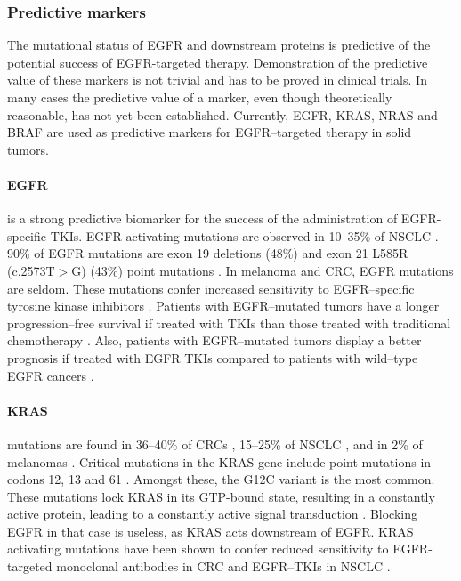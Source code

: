 {{{    \subsubsection{Predictive markers}

      The mutational status of EGFR and downstream proteins is predictive of the
      potential success of EGFR-targeted therapy. Demonstration of the
      predictive value of these markers is not trivial and has to be proved in
      clinical trials. In many cases the predictive value of a marker, even
      though theoretically reasonable, has not yet been established. Currently,
      EGFR, KRAS, NRAS and BRAF are  used as predictive markers for
      EGFR--targeted therapy in solid tumors.

      \paragraph{EGFR} is a strong predictive biomarker for the success of the
      administration of EGFR-specific TKIs. EGFR activating mutations are
      observed in 10--35\% of NSCLC {\cite{egfr_nsclc}}. 90\% of EGFR mutations are exon 19
      deletions (48\%) and exon 21 L585R (c.2573T$>$G) (43\%) point mutations {\cite{egfr_nsclc_2}}.
      In melanoma and CRC, EGFR mutations are seldom. These mutations confer
      increased sensitivity to EGFR--specific tyrosine kinase inhibitors  {\cite{egfr_nsclc_2}}.
      Patients with EGFR--mutated tumors have a longer progression--free
      survival if treated with TKIs than those treated with traditional
      chemotherapy {\cite{egfr_nsclc_2}}. Also, patients with EGFR--mutated tumors display a better
      prognosis if treated with EGFR TKIs compared to patients with wild--type
      EGFR cancers {\cite{egfr_nsclc_2}}.

      \paragraph{KRAS} mutations are found in 36--40\% of CRCs {\cite{kras_crc}}, 15--25\% of
      NSCLC {\cite{kras_nsclc}}, and in 2\% of melanomas {\cite{melanoma_kras}}. Critical mutations in the KRAS gene
      include point mutations in codons 12, 13 and 61 {\cite{kras_nsclc}} {\cite{kras_crc}}. Amongst these, the G12C
      variant is the most common. These mutations lock KRAS in its GTP-bound
      state, resulting in a constantly active protein, leading to a constantly
      active signal transduction {\cite{kras_activating}}. Blocking EGFR in that case is useless, as KRAS
      acts downstream of EGFR. KRAS activating mutations have been shown to
      confer reduced sensitivity to EGFR-targeted monoclonal antibodies in CRC
      and EGFR--TKIs in NSCLC {\cite{kras_nsclc}} {\cite{kras_crc}}.

}}}
